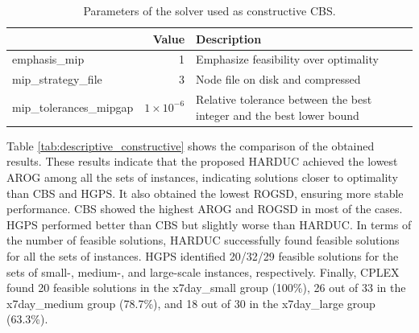 \begin{table}[H]
\centering
\caption{Parameters of the solver used as constructive CBS.}
\label{tab:parameters_solverMILP1}
\scriptsize
\begin{tabular}{>{\RaggedRight}p{3.5cm}r>{\RaggedRight}p{6cm}r}\toprule
{Parameter} & {Value} & {Description} \\\cmidrule{1-3}
emphasis\_mip &1 &Emphasize feasibility over optimality \\
mip\_strategy\_file &3 &Node file on disk and compressed \\
mip\_tolerances\_mipgap & $1 \times 10^{-6}$  &Relative tolerance between the best integer and the best lower bound \\
\bottomrule
\end{tabular}
\end{table}


Table \ref{tab:descriptive_constructive} shows the comparison of the obtained results. These results indicate that the proposed HARDUC achieved the lowest AROG among all the sets of instances, indicating solutions closer to optimality than CBS and HGPS. It also obtained the lowest ROGSD, ensuring more stable performance. CBS showed the highest AROG and ROGSD in most of the cases. HGPS performed better than CBS but slightly  worse than HARDUC. In terms of the number of feasible solutions, HARDUC successfully found feasible solutions for all the sets of instances. HGPS identified 20/32/29 feasible solutions for the sets of small-, medium-, and large-scale instances, respectively. Finally, CPLEX found 20 feasible solutions in the x7day\_small group (100\%), 26 out of 33 in the x7day\_medium group (78.7\%), and 18 out of 30 in the x7day\_large group (63.3\%).


\begin{table}[H]\centering
\caption{Comparison of constructive methods.}
\label{tab:descriptive_constructive}
\scriptsize
{}
\end{table}



